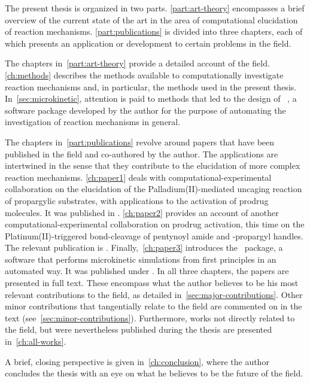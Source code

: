 The present thesis is organized in two parts.
\cref{part:art-theory}
encompasses a brief overview of the current state of the art in the area of
computational elucidation of reaction mechanisms.
\cref{part:publications} is divided into three chapters,
each of which
presents an application or development to certain problems in the field.

The chapters in~\cref{part:art-theory} provide a detailed account of the
field.
\cref{ch:methods} describes the methods available to computationally
investigate reaction mechanisms and,
in particular,
the methods used in the
present thesis.
In~\cref{sec:microkinetic},
attention is paid to methods that led to the design
of \overreact{}~\cite{Schneider_2022,overreact2021zenodo},
a software package developed by the
author for the purpose of automating the investigation of reaction mechanisms
in general.

The chapters in~\cref{part:publications} revolve around papers that have
been published in the field and co-authored by the author.
The applications are intertwined in the sense
that they contribute to the elucidation of more complex reaction mechanisms.
\cref{ch:paper1} deals with
computational-experimental collaboration on the elucidation
of the Palladium(II)-mediated uncaging reaction of propargylic substrates,
with applications to the activation of prodrug molecules.\@
It was published in
.
\cref{ch:paper2} provides an account of
another computational-experimental collaboration on prodrug activation,
this time on the Platinum(II)-triggered bond-cleavage
of pentynoyl amide and -propargyl handles.\@
The relevant publication is
.
Finally,~\cref{ch:paper3} introduces the
\overreact{}~package,
a software that performs microkinetic simulations
from first principles in an automated way.\@
It was published under
.
In all three chapters,
the papers are presented in full text.
These encompass what the author believes to be his most relevant
contributions to the field,
as detailed in~\cref{sec:major-contributions}.
Other minor contributions that tangentially relate to the field are commented
on in the text (see~\cref{sec:minor-contributions}).
Furthermore,
works not directly related to the
field,
but were nevertheless published during the thesis are
presented in~\cref{ch:all-works}.

A brief,
closing perspective is given in~\cref{ch:conclusion},
where
the author concludes the thesis with an eye on what he believes to be the
future of the field.
